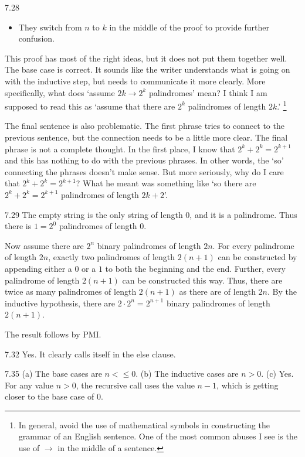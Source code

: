 \begin{Answer}{7.28}
\begin{pfevalenum}
\begin{itemize}
	\item
	They switch from $n$ to $k$ in the middle of the proof to provide further confusion.
	\end{itemize}
\item
This proof has most of the right ideas, but it does not put them together well.
The base case is correct.
It sounds like the writer understands what is going on with the inductive step,
but needs to communicate it more clearly.
More specifically, what does `assume $2k\rightarrow 2^k$ palindromes' mean?
I think I am supposed to read this as `assume that there are $2^k$ palindromes of length $2k$.'
\footnote{In general, avoid the use of mathematical symbols in constructing the grammar of an English sentence.
One of the most common abuses I see is the use of $\rightarrow$ in the middle of a sentence.}

The final sentence is also problematic.  The first phrase tries to connect to the previous sentence,
but the connection needs to be a little more clear.  The final phrase is not a complete thought.
In the first place, I know that  $2^k+2^k=2^{k+1}$ and this has nothing to do with the previous
phrases.  In other words, the `so' connecting the phrases doesn't make sense.  But more seriously,
why do I care that $2^k+2^k=2^{k+1}$?  What he meant was something like
`so there are $2^k+2^k=2^{k+1}$ palindromes of length $2k+2$'.
\end{pfevalenum}
\end{Answer}
\begin{Answer}{7.29}
The empty string is the only string of length $0$, and it is a palindrome.
Thus there is $1=2^0$ palindromes of length $0$.

Now assume there are $2^n$ binary palindromes of length $2n$.
For every palindrome of length $2n$, exactly two palindromes of length $2(n+1)$ can be constructed
by appending either a $0$ or a $1$ to both the beginning and the end.  Further, every palindrome
of length $2(n+1)$ can be constructed this way.  Thus, there are twice as many palindromes of
length $2(n+1)$ as there are of length $2n$.  By the inductive hypothesis, there are $2\cdot 2^n=2^{n+1}$
binary palindromes of length $2(n+1)$.

The result follows by PMI.
\end{Answer}
\begin{Answer}{7.32}
Yes.  It clearly calls itself in the else clause.
\end{Answer}
\begin{Answer}{7.35}
(a) The base cases are $n<\leq 0$.
(b) The inductive cases are $n>0$.
(c) Yes.  For any value $n>0$, the recursive call uses the value $n-1$, which is getting
closer to the base case of $0$.
\end{Answer}
